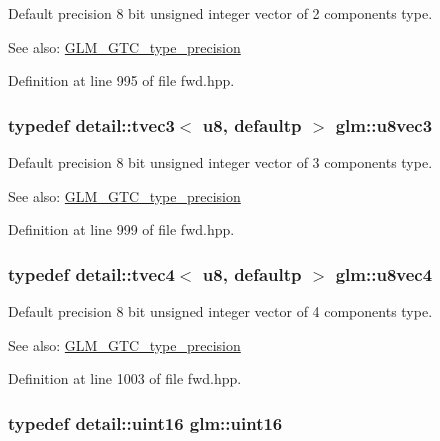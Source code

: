 Default precision 8 bit unsigned integer vector of 2 components type. \begin{Desc}
\item[See also:]\hyperlink{group__gtc__type__precision}{GLM\_\-GTC\_\-type\_\-precision} \end{Desc}


Definition at line 995 of file fwd.hpp.\hypertarget{group__gtc__type__precision_g3b4624ecd0485fe5143f956864e7934e}{
\subsubsection[u8vec3]{\setlength{\rightskip}{0pt plus 5cm}typedef detail::tvec3$<$ u8, defaultp $>$ {\bf glm::u8vec3}}}
\label{group__gtc__type__precision_g3b4624ecd0485fe5143f956864e7934e}


Default precision 8 bit unsigned integer vector of 3 components type. \begin{Desc}
\item[See also:]\hyperlink{group__gtc__type__precision}{GLM\_\-GTC\_\-type\_\-precision} \end{Desc}


Definition at line 999 of file fwd.hpp.\hypertarget{group__gtc__type__precision_gaf6b3d127698d893de8652deedfd3d9b}{
\subsubsection[u8vec4]{\setlength{\rightskip}{0pt plus 5cm}typedef detail::tvec4$<$ u8, defaultp $>$ {\bf glm::u8vec4}}}
\label{group__gtc__type__precision_gaf6b3d127698d893de8652deedfd3d9b}


Default precision 8 bit unsigned integer vector of 4 components type. \begin{Desc}
\item[See also:]\hyperlink{group__gtc__type__precision}{GLM\_\-GTC\_\-type\_\-precision} \end{Desc}


Definition at line 1003 of file fwd.hpp.\hypertarget{group__gtc__type__precision_gd8c2939e1fdd8e5828b31d95c52255d5}{
\subsubsection[uint16]{\setlength{\rightskip}{0pt plus 5cm}typedef detail::uint16 {\bf glm::uint16}}}
\label{group__gtc__type__precision_gd8c2939e1fdd8e5828b31d95c52255d5}


